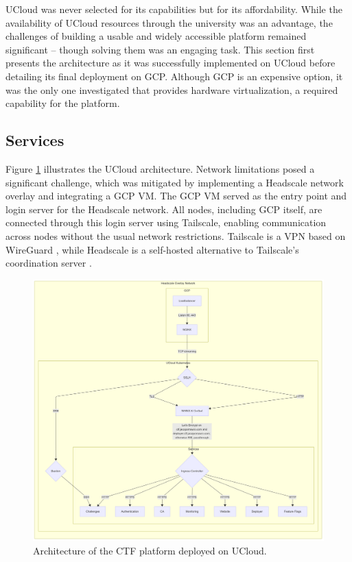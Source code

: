 UCloud was never selected for its capabilities but for its affordability. While the availability of UCloud resources through the university was an advantage, the challenges of building a usable and widely accessible platform remained significant -- though solving them was an engaging task. This section first presents the architecture as it was successfully implemented on UCloud before detailing its final deployment on GCP. Although GCP is an expensive option, it was the only one investigated that provides hardware virtualization, a required capability for the platform.

\subsection{Services}

Figure \ref{fig:architecture} illustrates the UCloud architecture. Network limitations posed a significant challenge, which was mitigated by implementing a Headscale network overlay and integrating a GCP VM. The GCP VM served as the entry point and login server for the Headscale network. All nodes, including GCP itself, are connected through this login server using Tailscale, enabling communication across nodes without the usual network restrictions. Tailscale is a VPN based on WireGuard \Parencite{TailscaleDocs}, while Headscale is a self-hosted alternative to Tailscale's coordination server \Parencite{TailscaleOpenSource}. 

\begin{figure}[h]
    \centering
    \includegraphics[width=1\textwidth]{images/ucloud-architecture.png}
    \caption{Architecture of the CTF platform deployed on UCloud.}
    \label{fig:architecture}
\end{figure}

